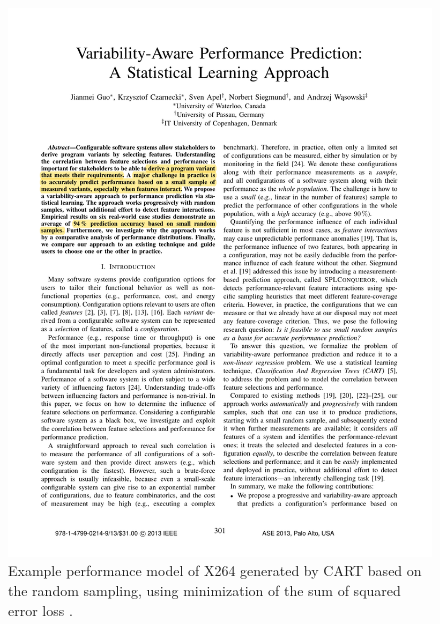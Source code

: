 \begin{figure}[h]
	\centering
	\includegraphics[page=4,clip,trim=3.5cm 18cm 3.5cm 1.5cm, width=\linewidth]
	{Paper/VariabilityAwarePerformancePredictionAStatisticalLearningApproach.pdf}
	\caption{Example performance model of X264 generated by CART based on the random sampling, using minimization of the sum of squared error loss \cite{VariabilityAwarePerformancePredictionJianmeiSigmundApel}.}	
	\label{fig:VAPPExampleTree}	
\end{figure}

